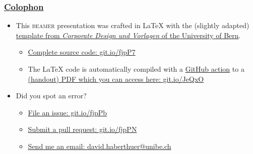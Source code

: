 \begin{frame}
  \frametitle[Colophon]{\href{https://en.wikipedia.org/wiki/Colophon_(publishing)}{Colophon}}
  \begin{itemize}
    \item This \textsc{beamer} presentation was crafted in \LaTeX\xspace with the (slightly adapted) \href{http://intern.unibe.ch/dienstleistungen/corporate_design_und_vorlagen/praesentationen/}{template from \emph{Corporate Design und Vorlagen} of the University of Bern}.
    \begin{itemize}
      \item \href{https://github.com/habi/lecture.microtomography/}{Complete source code: git.io/fjpP7}
      \item The \LaTeX\xspace code is automatically compiled with a \href{https://github.com/actions}{GitHub action} to a \href{https://habi.github.io/Lecture.Microtomography/XRayMicroTomography.Handout.pdf}{(handout) PDF which you can access here: git.io/JeQxO}
    \end{itemize}
    \item Did you spot an error?
    \begin{itemize}
      \item \href{https://github.com/habi/lecture.microtomography/issues}{File an issue: git.io/fjpPb}
      \item \href{https://github.com/habi/lecture.microtomography/pulls}{Submit a pull request: git.io/fjpPN}
      \item \href{mailto:david.haberthuer@unibe.ch?subject=Error\%20in\%20the\%20(micro)-tomography\%20lecture\&body=https://xkcd.com/386/}{Send me an email: david.haberthuer@unibe.ch}
    \end{itemize}
  \end{itemize}
\end{frame}


